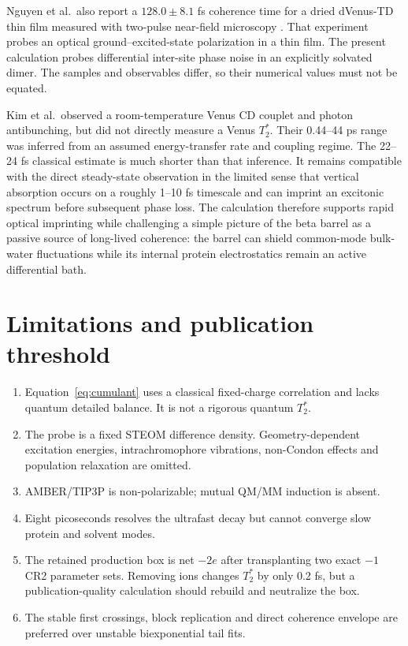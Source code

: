 \documentclass[11pt]{article}
\newcommand{\Ttwo}{T_2^{*}}
\begin{document}
Nguyen et al.\ also report a $128.0\pm8.1$ fs coherence time for a dried
dVenus-TD thin film measured with two-pulse near-field microscopy
\cite{nguyen2025}.  That experiment probes an optical ground--excited-state
polarization in a thin film.  The present calculation probes differential
inter-site phase noise in an explicitly solvated dimer.  The samples and
observables differ, so their numerical values must not be equated.

Kim et al.\ observed a room-temperature Venus CD couplet and photon
antibunching, but did not directly measure a Venus $\Ttwo$\cite{kim2019}.  Their
0.44--44 ps range was inferred from an assumed energy-transfer rate and coupling
regime.  The 22--24 fs classical estimate is much shorter than that inference.
It remains compatible with the direct steady-state observation in the limited
sense that vertical absorption occurs on a roughly 1--10 fs timescale and can
imprint an excitonic spectrum before subsequent phase loss.  The calculation
therefore supports rapid optical imprinting while challenging a simple picture
of the beta barrel as a passive source of long-lived coherence: the barrel can
shield common-mode bulk-water fluctuations while its internal protein
electrostatics remain an active differential bath.

\section{Limitations and publication threshold}

\begin{enumerate}
  \item Equation~\eqref{eq:cumulant} uses a classical fixed-charge correlation
        and lacks quantum detailed balance.  It is not a rigorous quantum
        $\Ttwo$.
  \item The probe is a fixed STEOM difference density.  Geometry-dependent
        excitation energies, intrachromophore vibrations, non-Condon effects
        and population relaxation are omitted.
  \item AMBER/TIP3P is non-polarizable; mutual QM/MM induction is absent.
  \item Eight picoseconds resolves the ultrafast decay but cannot converge slow
        protein and solvent modes.
  \item The retained production box is net $-2e$ after transplanting two exact
        $-1$ CR2 parameter sets.  Removing ions changes $\Ttwo$ by only 0.2 fs,
        but a publication-quality calculation should rebuild and neutralize the
        box.
  \item The stable first crossings, block replication and direct coherence
        envelope are preferred over unstable biexponential tail fits.
\end{enumerate}
\end{document}
